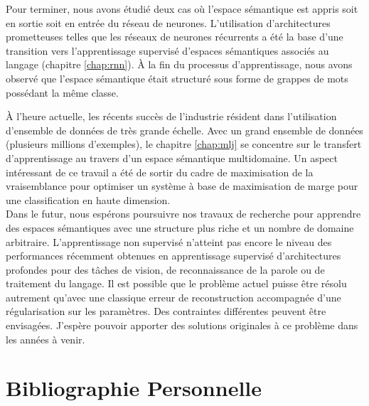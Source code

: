 Pour terminer, nous avons étudié deux cas où l'espace sémantique est appris
soit en sortie soit en entrée du réseau de neurones. L'utilisation
d'architectures prometteuses telles que les réseaux de neurones récurrents a
été la base d'une transition vers l'apprentissage supervisé d'espaces
sémantiques associés au langage (chapitre \ref{chap:rnn}).  À la fin du processus
d'apprentissage, nous avons observé que l'espace sémantique était structuré
sous forme de grappes de mots possédant la même classe.

À l'heure actuelle, les récents succès de l'industrie résident dans
l'utilisation d'ensemble de données de très grande échelle.  Avec un grand
ensemble de données (plusieurs millions d'exemples), le chapitre \ref{chap:mlj}
se concentre sur le transfert d'apprentissage au travers d'un espace sémantique
multidomaine. Un aspect intéressant de ce travail a été de sortir du
cadre de maximisation de la vraisemblance pour optimiser un système à base de
maximisation de marge pour une classification en haute dimension.  \\

Dans le futur, nous espérons poursuivre nos travaux de recherche pour apprendre
des espaces sémantiques avec une structure plus riche et un nombre de domaine
arbitraire. L'apprentissage non supervisé n'atteint pas encore le niveau des
performances récemment obtenues en apprentissage supervisé d'architectures
profondes pour des tâches de vision, de reconnaissance de la parole ou de
traitement du langage. Il est possible que le problème actuel puisse être
résolu autrement qu'avec une classique erreur de reconstruction accompagnée
d'une régularisation sur les paramètres. Des contraintes différentes peuvent
être envisagées. J'espère pouvoir apporter des solutions originales à ce
problème dans les années à venir.

\chapter*{Bibliographie Personnelle}

